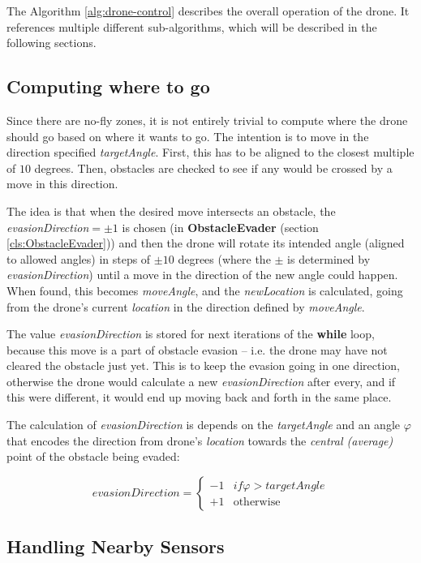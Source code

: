\documentclass{article}
\newcommand{\sref}[1]{(section \ref{#1})}
\begin{document}
The Algorithm \ref{alg:drone-control} describes the overall operation of the drone. It references multiple different sub-algorithms, which will be described in the following sections.

\subsection{Computing where to go}
\label{alg:evasion}

Since there are no-fly zones, it is not entirely trivial to compute where the drone should go based on where it wants to go. The intention is to move in the direction specified \textit{targetAngle}. First, this has to be aligned to the closest multiple of $10$ degrees. Then, obstacles are checked to see if any would be crossed by a move in this direction.

The idea is that when the desired move intersects an obstacle, the \textit{evasionDirection}$=\pm 1$ is chosen (in \textbf{ObstacleEvader} \sref{cls:ObstacleEvader}) and then the drone will rotate its intended angle (aligned to allowed angles) in steps of $\pm 10$ degrees (where the $\pm$ is determined by \textit{evasionDirection}) until a move in the direction of the new angle could happen. When found, this becomes \textit{moveAngle}, and the \textit{newLocation} is calculated, going from the drone's current \textit{location} in the direction defined by \textit{moveAngle}.

The value \textit{evasionDirection} is stored for next iterations of the \textbf{while} loop, because this move is a part of obstacle evasion -- i.e. the drone may have not cleared the obstacle just yet. This is to keep the evasion going in one direction, otherwise the drone would calculate a new \textit{evasionDirection} after every, and if this were different, it would end up moving back and forth in the same place.

The calculation of \textit{evasionDirection} is depends on the \textit{targetAngle} and an angle $\varphi$ that encodes the direction from drone's \textit{location} towards the \textit{central (average)} point of the obstacle being evaded:

\[ evasionDirection =
  \begin{cases}
    -1 & \mathit{if} \varphi > targetAngle \\
    +1 & \mathrm{otherwise}
  \end{cases}
\]

\subsection{Handling Nearby Sensors}
\label{alg:sensors}
\end{document}

